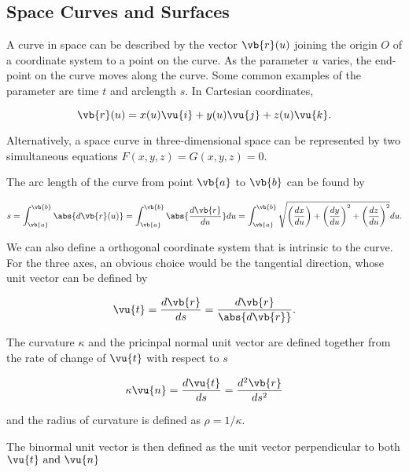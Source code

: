 \documentclass[english,a4paper,12pt]{report}
\begin{document}
\subsection{Space Curves and Surfaces}

A curve in space can be described by the vector \(\vb{r} (u)\) joining the origin \(O\) of a coordinate system to a point on the curve. As the parameter \(u\) varies, the end-point on the curve moves along the curve. Some common examples of the parameter are time \(t\) and arclength \(s\). In Cartesian coordinates, 

\begin{equation}
	\vb{r} (u) = x(u) \vu{i} + y(u) \vu{j} + z(u) \vu{k} .
\end{equation}

Alternatively, a space curve in three-dimensional space can be represented by two simultaneous equations \(F(x,y,z) = G(x,y,z) = 0\). 

The arc length of the curve from point \(\vb{a} \) to \(\vb{b} \) can be found by

\begin{equation}
	s = \int_{\vb{a} }^{\vb{b} } \abs{d \vb{r} (u)} = \int_{\vb{a} }^{\vb{b} } \abs{\frac{d\vb{r} }{du} } du = \int_{\vb{a} }^{\vb{b} } \sqrt{\left( \frac{dx}{du}\right) + \left( \frac{dy}{du}  \right)^2 + \left( \frac{dz}{du}  \right)^2} du.
\end{equation}

We can also define a orthogonal coordinate system that is intrinsic to the curve. For the three axes, an obvious choice would be the tangential direction, whose unit vector can be defined by

\begin{equation}
	\vu{t} = \frac{d\vb{r} }{ds} = \frac{d \vb{r} }{\abs{d \vb{r} } }.
\end{equation}

The curvature \(\kappa \) and the pricinpal normal unit vector are defined together from the rate of change of \(\vu{t} \) with respect to \(s\)

\begin{equation}
	\kappa \vu{n}  = \frac{d \vu{t} }{ds} = \frac{d^2\vb{r} }{ds^2}
\end{equation}

and the radius of curvature is defined as \(\rho = 1/\kappa  \). 

The binormal unit vector is then defined as the unit vector perpendicular to both \(\vu{t}  \text { and } \vu{n} \) 
\end{document}
